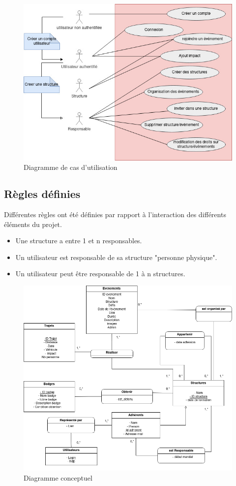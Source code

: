 \begin{figure}[h]
    \centering
    \includegraphics[width=0.8\linewidth]{pictures/use_case_pfa.jpg}
    \caption{Diagramme de cas d'utilisation}
    \label{fig:diag_use_case}
\end{figure}




\subsection{Règles définies}
Différentes règles ont été définies par rapport à l'interaction des différents éléments du projet.
\begin{itemize}
    \item Une structure a entre 1 et n responsables.
    \item Un utilisateur est responsable de sa structure "personne physique".
    \item Un utilisateur peut être responsable de 1 à n structures.
\end{itemize}

\begin{figure}
    \centering
    \includegraphics[width=1.1\linewidth]{pictures/diag_concept.png}
    \caption{Diagramme conceptuel}
    \label{fig:diag_concept}
\end{figure}

